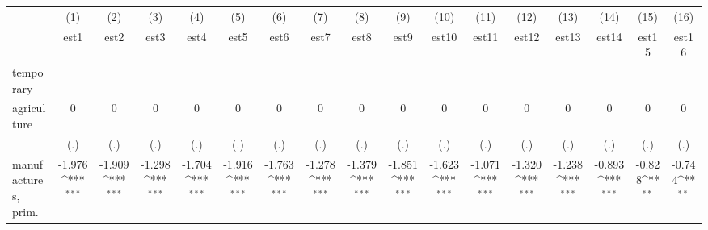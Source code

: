 {
\def\sym#1{\ifmmode^{#1}\else\(^{#1}\)\fi}
\begin{tabular}{l*{16}{c}}
\hline\hline
                    &\multicolumn{1}{c}{(1)}&\multicolumn{1}{c}{(2)}&\multicolumn{1}{c}{(3)}&\multicolumn{1}{c}{(4)}&\multicolumn{1}{c}{(5)}&\multicolumn{1}{c}{(6)}&\multicolumn{1}{c}{(7)}&\multicolumn{1}{c}{(8)}&\multicolumn{1}{c}{(9)}&\multicolumn{1}{c}{(10)}&\multicolumn{1}{c}{(11)}&\multicolumn{1}{c}{(12)}&\multicolumn{1}{c}{(13)}&\multicolumn{1}{c}{(14)}&\multicolumn{1}{c}{(15)}&\multicolumn{1}{c}{(16)}\\
                    &\multicolumn{1}{c}{est1}&\multicolumn{1}{c}{est2}&\multicolumn{1}{c}{est3}&\multicolumn{1}{c}{est4}&\multicolumn{1}{c}{est5}&\multicolumn{1}{c}{est6}&\multicolumn{1}{c}{est7}&\multicolumn{1}{c}{est8}&\multicolumn{1}{c}{est9}&\multicolumn{1}{c}{est10}&\multicolumn{1}{c}{est11}&\multicolumn{1}{c}{est12}&\multicolumn{1}{c}{est13}&\multicolumn{1}{c}{est14}&\multicolumn{1}{c}{est15}&\multicolumn{1}{c}{est16}\\
\hline
temporary           &                     &                     &                     &                     &                     &                     &                     &                     &                     &                     &                     &                     &                     &                     &                     &                     \\
agriculture         &           0         &           0         &           0         &           0         &           0         &           0         &           0         &           0         &           0         &           0         &           0         &           0         &           0         &           0         &           0         &           0         \\
                    &         (.)         &         (.)         &         (.)         &         (.)         &         (.)         &         (.)         &         (.)         &         (.)         &         (.)         &         (.)         &         (.)         &         (.)         &         (.)         &         (.)         &         (.)         &         (.)         \\
[1em]
manufactures, prim. &      -1.976\sym{***}&      -1.909\sym{***}&      -1.298\sym{***}&      -1.704\sym{***}&      -1.916\sym{***}&      -1.763\sym{***}&      -1.278\sym{***}&      -1.379\sym{***}&      -1.851\sym{***}&      -1.623\sym{***}&      -1.071\sym{***}&      -1.320\sym{***}&      -1.238\sym{***}&      -0.893\sym{***}&      -0.828\sym{**} &      -0.744\sym{**} \\

\end{tabular}}
